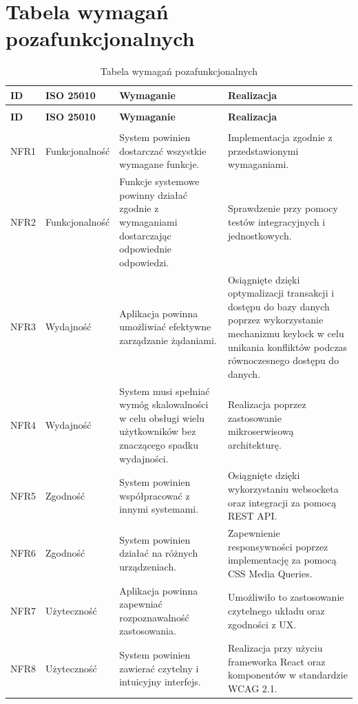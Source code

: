 \section{Tabela wymagań pozafunkcjonalnych}
\small{
\begin{longtable}{|p{1cm}|p{2.5cm}|p{4.5cm}|p{5cm}|}
    \hline
    \textbf{ID} & \textbf{ISO 25010} & \textbf{Wymaganie} & \textbf{Realizacja} \\
    \hline
    \endfirsthead
    \caption[]{Tabela wymagań pozafunkcjonalnych -- ciąg dalszy} \\
    \hline
    \textbf{ID} & \textbf{ISO 25010} & \textbf{Wymaganie} & \textbf{Realizacja} \\
    \hline
    \endhead
    \hline
    \endfoot
    \hline
    \caption{Tabela wymagań pozafunkcjonalnych} \label{tab:NFR-table} \\
    \endlastfoot
    NFR1 & Funkcjonalność & System powinien dostarczać wszystkie wymagane funkcje. & Implementacja zgodnie z przedstawionymi wymaganiami.\\
    \hline
    NFR2 & Funkcjonalność & Funkcje systemowe powinny działać zgodnie z wymaganiami dostarczając odpowiednie odpowiedzi. & Sprawdzenie przy pomocy testów integracyjnych i jednostkowych. \\
    \hline
    NFR3 & Wydajność & Aplikacja powinna umożliwiać efektywne zarządzanie żądaniami. &  Osiągnięte dzięki optymalizacji transakcji i dostępu do bazy danych poprzez wykorzystanie mechanizmu keylock w celu unikania konfliktów podczas równoczesnego dostępu do danych. \\
    \hline
    NFR4 & Wydajność & System musi spełniać wymóg skalowalności w celu obsługi wielu użytkowników bez znaczącego spadku wydajności. & Realizacja poprzez zastosowanie mikroserwisową architekturę. \\
    \hline
    NFR5 & Zgodność & System powinien współpracować z innymi systemami. & Osiągnięte dzięki wykorzystaniu websocketa oraz integracji za pomocą REST API. \\
    \hline
    NFR6 & Zgodność & System powinien działać na różnych urządzeniach. & Zapewnienie responsywności poprzez implementację za pomocą CSS Media Queries. \\
    \hline
    NFR7 & Użyteczność & Aplikacja powinna zapewniać rozpoznawalność zastosowania. & Umożliwiło to zastosowanie czytelnego układu oraz zgodności z UX. \\
    \hline
    NFR8 & Użyteczność & System powinien zawierać czytelny i intuicyjny interfejs. & Realizacja przy użyciu frameworka React oraz komponentów w standardzie WCAG 2.1. \\

\end{longtable}}
